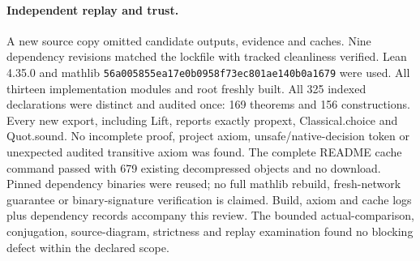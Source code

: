 \documentclass{article}
\begin{document}
\paragraph{Independent replay and trust.} A new source copy omitted candidate outputs, evidence and caches. Nine dependency revisions matched the lockfile with tracked cleanliness verified. Lean 4.35.0 and mathlib \texttt{56a005855ea17e0b0958f73ec801ae140b0a1679} were used. All thirteen implementation modules and root freshly built. All 325 indexed declarations were distinct and audited once: 169 theorems and 156 constructions. Every new export, including Lift, reports exactly propext, Classical.choice and Quot.sound. No incomplete proof, project axiom, unsafe/native-decision token or unexpected audited transitive axiom was found. The complete README cache command passed with 679 existing decompressed objects and no download. Pinned dependency binaries were reused; no full mathlib rebuild, fresh-network guarantee or binary-signature verification is claimed. Build, axiom and cache logs plus dependency records accompany this review. The bounded actual-comparison, conjugation, source-diagram, strictness and replay examination found no blocking defect within the declared scope.
\end{document}
